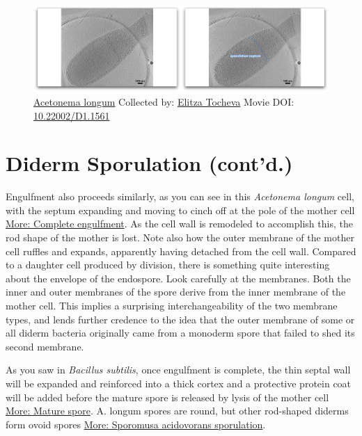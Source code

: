 \documentclass[]{tufte-book}
\begin{document}
\begin{figure}
\includegraphics{movie_stills/8_9} \caption[\protect\hyperlink{tree}{Acetonema longum} Collected by:
\protect\hyperlink{elitza_tocheva}{Elitza Tocheva} Movie DOI:
\href{https://doi.org/10.22002/D1.1561}{10.22002/D1.1561}]{\protect\hyperlink{tree}{Acetonema longum} Collected by:
\protect\hyperlink{elitza_tocheva}{Elitza Tocheva} Movie DOI:
\href{https://doi.org/10.22002/D1.1561}{10.22002/D1.1561}}\label{fig:8-9}
\end{figure}

\section{Diderm Sporulation (cont'd.)}\label{diderm-sporulation-contd.}

Engulfment also proceeds similarly, as you can see in this
\emph{Acetonema longum} cell, with the septum expanding and moving to
cinch off at the pole of the mother cell
\protect\hyperlink{Complete_engulfment}{More: Complete engulfment}. As
the cell wall is remodeled to accomplish this, the rod shape of the
mother is lost. Note also how the outer membrane of the mother cell
ruffles and expands, apparently having detached from the cell wall.
Compared to a daughter cell produced by division, there is something
quite interesting about the envelope of the endospore. Look carefully at
the membranes. Both the inner and outer membranes of the spore derive
from the inner membrane of the mother cell. This implies a surprising
interchangeability of the two membrane types, and lends further credence
to the idea that the outer membrane of some or all diderm bacteria
originally came from a monoderm spore that failed to shed its second
membrane.

As you saw in \emph{Bacillus subtilis}, once engulfment is complete, the
thin septal wall will be expanded and reinforced into a thick cortex and
a protective protein coat will be added before the mature spore is
released by lysis of the mother cell
\protect\hyperlink{Mature_spore}{More: Mature spore}. A. longum spores
are round, but other rod-shaped diderms form ovoid spores
\protect\hyperlink{Sporomusa_acidovorans_sporulation}{More: Sporomusa
acidovorans sporulation}.
\end{document}
